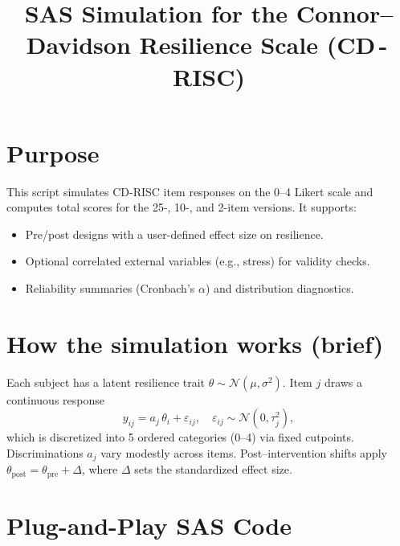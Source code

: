 \documentclass[12pt]{article}
\title{SAS Simulation for the Connor--Davidson Resilience Scale (CD\,-\,RISC)}
\author{}
\date{}
\begin{document}
\maketitle

\section*{Purpose}
This script simulates CD-RISC item responses on the 0--4 Likert scale and computes total scores for the 25-, 10-, and 2-item versions. It supports:
\begin{itemize}
  \item Pre/post designs with a user-defined effect size on resilience.
  \item Optional correlated external variables (e.g., stress) for validity checks.
  \item Reliability summaries (Cronbach's $\alpha$) and distribution diagnostics.
\end{itemize}

\section*{How the simulation works (brief)}
Each subject has a latent resilience trait $\theta \sim \mathcal{N}(\mu,\sigma^2)$. Item $j$ draws a continuous response
\[
y_{ij} = a_j\,\theta_i + \varepsilon_{ij},\quad \varepsilon_{ij}\sim \mathcal{N}(0,\tau_j^2),
\]
which is discretized into 5 ordered categories (0--4) via fixed cutpoints. Discriminations $a_j$ vary modestly across items. Post--intervention shifts apply $\theta_{\text{post}} = \theta_{\text{pre}} + \Delta$, where $\Delta$ sets the standardized effect size.

\section*{Plug-and-Play SAS Code}
\end{document}
